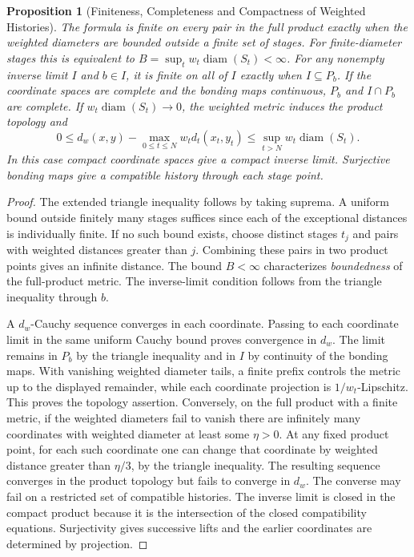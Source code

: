 \documentclass[11pt,a4paper]{article}
\theoremstyle{plain}
\newtheorem{proposition}[theorem]{Proposition}
\theoremstyle{definition}
\theoremstyle{remark}
\begin{document}
\begin{proposition}[Finiteness, Completeness and Compactness of Weighted Histories]\label{prop:weighted-history}
The formula is finite on every pair in the full product exactly when the weighted diameters are bounded outside a finite set of stages. For finite-diameter stages this is equivalent to $B=\sup_t w_t\operatorname{diam}(S_t)<\infty$. For any nonempty inverse limit $I$ and $b\in I$, it is finite on all of $I$ exactly when $I\subseteq P_b$. If the coordinate spaces are complete and the bonding maps continuous, $P_b$ and $I\cap P_b$ are complete. If $w_t\operatorname{diam}(S_t)\to0$, the weighted metric induces the product topology and
\[
 0\leq d_w(x,y)-\max_{0\leq t\leq N} w_t d_t(x_t,y_t)
 \leq \sup_{t>N} w_t\operatorname{diam}(S_t).
\]
In this case compact coordinate spaces give a compact inverse limit. Surjective bonding maps give a compatible history through each stage point.
\end{proposition}

\begin{proof}
The extended triangle inequality follows by taking suprema. A uniform bound outside finitely many stages suffices since each of the exceptional distances is individually finite. If no such bound exists, choose distinct stages $t_j$ and pairs with weighted distances greater than $j$. Combining these pairs in two product points gives an infinite distance. The bound $B<\infty$ characterizes \emph{boundedness} of the full-product metric. The inverse-limit condition follows from the triangle inequality through $b$.

A $d_w$-Cauchy sequence converges in each coordinate. Passing to each coordinate limit in the same uniform Cauchy bound proves convergence in $d_w$. The limit remains in $P_b$ by the triangle inequality and in $I$ by continuity of the bonding maps. With vanishing weighted diameter tails, a finite prefix controls the metric up to the displayed remainder, while each coordinate projection is $1/w_t$-Lipschitz. This proves the topology assertion. Conversely, on the full product with a finite metric, if the weighted diameters fail to vanish there are infinitely many coordinates with weighted diameter at least some $\eta>0$. At any fixed product point, for each such coordinate one can change that coordinate by weighted distance greater than $\eta/3$, by the triangle inequality. The resulting sequence converges in the product topology but fails to converge in $d_w$. The converse may fail on a restricted set of compatible histories. The inverse limit is closed in the compact product because it is the intersection of the closed compatibility equations. Surjectivity gives successive lifts and the earlier coordinates are determined by projection.
\end{proof}
\end{document}
